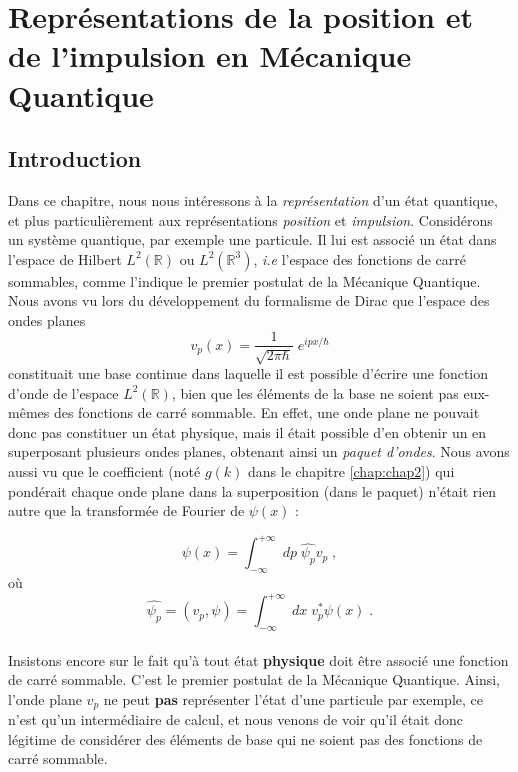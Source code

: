 \documentclass[../notesdecours]{subfiles}
\begin{document}
\chapter{Représentations de la position et de l'impulsion en Mécanique Quantique}\label{chap:chap6}

\section{Introduction}
Dans ce chapitre, nous nous intéressons à la \textit{représentation} d'un état quantique, et plus particulièrement aux représentations \textit{position} et \textit{impulsion}. Considérons un système quantique, par exemple une particule. Il lui est associé un état dans l'espace de Hilbert $L^2(\mathbb{R})$ ou $L^2(\mathbb{R}^3)$, \textit{i.e} l'espace des fonctions de carré sommables, comme l'indique le premier postulat de la Mécanique Quantique. \\

Nous avons vu lors du développement du formalisme de Dirac que l'espace des ondes planes $$v_p(x) = \frac{1}{\sqrt{2 \pi \hbar}} \; e^{ipx/\hbar}$$ constituait une base continue dans laquelle il est possible d'écrire une fonction d'onde de l'espace $L^2(\mathbb{R})$, bien que les éléments de la base ne soient pas eux-mêmes des fonctions de carré sommable. En effet, une onde plane ne pouvait donc pas constituer un état physique, mais il était possible d'en obtenir un en superposant plusieurs ondes planes, obtenant ainsi un \textit{paquet d'ondes}. Nous avons aussi vu que le coefficient (noté $g(k)$ dans le chapitre \ref{chap:chap2}) qui pondérait chaque onde plane dans la superposition (dans le paquet) n'était rien autre que la transformée de Fourier de $\psi(x)$ :

$$ \psi(x) = \int_{-\infty}^{+\infty} \; dp \; \hat{\psi_p} v_p \; , $$ où $$\hat{\psi_p} = (v_p, \psi) = \int_{-\infty}^{+\infty} \; dx \; v_p^* \psi(x)\; .$$ \\


Insistons encore sur le fait qu'à tout état \textbf{physique} doit être associé une fonction de carré sommable. C'est le premier postulat de la Mécanique Quantique. Ainsi, l'onde plane $v_p$ ne peut \textbf{pas} représenter l'état d'une particule par exemple, ce n'est qu'un intermédiaire de calcul, et nous venons de voir qu'il était donc légitime de considérer des éléments de base qui ne soient pas des fonctions de carré sommable. \\
\end{document}
